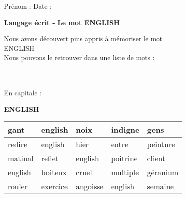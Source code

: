 \documentclass[a4paper, 11pt,oneside, fleqn]{article}
\begin{document}
\newcommand{\x}{\times}
\renewcommand{\arraystretch}{1.5}

\sloppy
\pagestyle{empty}
\begin{onehalfspace}


\sffamily \noindent \Large Pr\'enom : \fbox{\begin{minipage}{9cm} \vspace{1.2cm}\hspace{9cm} \end{minipage}} \hspace{1.5cm}\Large Date :\vspace{2mm}\\
\begin{minipage}{12cm}
\begin{center}
\Large\textbf{Langage \'ecrit - Le mot \MakeUppercase{english}}
\end{center}
\normalsize Nous avons d\'ecouvert puis appris \`a m\'emoriser le mot\\
\MakeUppercase{english}\\
Nous pouvons le retrouver dans une liste de mots : \end{minipage}\\
\vspace{0.25cm}\\
 
\large\noindent En capitale :
\begin{center}
{\huge \textbf{\MakeUppercase{english}}}
\vspace{0.25cm}\\
\begin{tabulary}{17cm}{|g|g|g|g|g|}
\hline
gant & english & noix & indigne & gens \\
\hline
redire & english & hier & entre & peinture \\
\hline
matinal & reflet & english & poitrine & client \\
\hline
english & boiteux & cruel & multiple & géranium \\
\hline
rouler & exercice & angoisse & english & semaine \\
\hline
\end{tabulary}
\end{center}
\vspace{0.5cm}


\end{onehalfspace}
\end{document}
